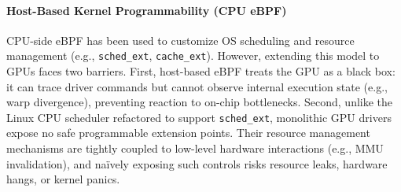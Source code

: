 \paragraph{Host-Based Kernel Programmability (CPU eBPF)}
CPU-side eBPF has been used to customize OS scheduling and resource management (e.g., \texttt{sched\_ext}, \texttt{cache\_ext}). However, extending this model to GPUs faces two barriers. First, host-based eBPF treats the GPU as a black box: it can trace driver commands but cannot observe internal execution state (e.g., warp divergence), preventing reaction to on-chip bottlenecks. Second, unlike the Linux CPU scheduler refactored to support \texttt{sched\_ext}, monolithic GPU drivers expose no safe programmable extension points. Their resource management mechanisms are tightly coupled to low-level hardware interactions (e.g., MMU invalidation), and naïvely exposing such controls risks resource leaks, hardware hangs, or kernel panics.